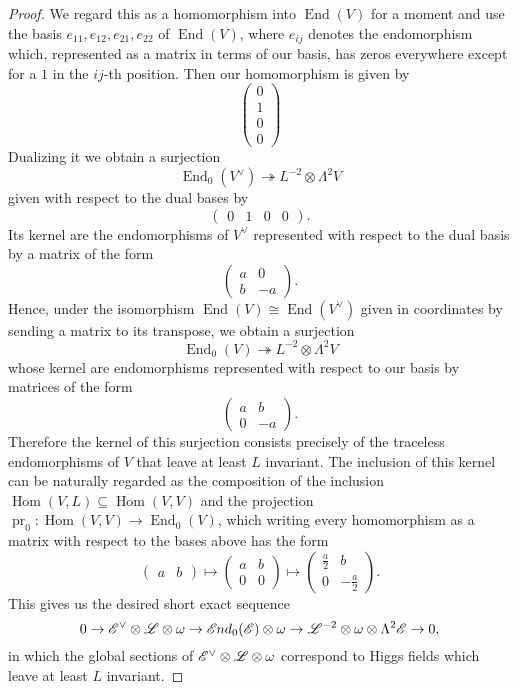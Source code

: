 \documentclass[A4paper, 12pt, british, reqno]{amsart}
\DeclareMathOperator{\Hom}{Hom}
\DeclareMathOperator{\End}{End}
\DeclareMathOperator{\pr}{pr}
\newcommand{\ot}{\otimes}
\newcommand{\dual}{^{\vee}}
\begin{document}
\begin{lm}
\begin{proof}
	We regard this as a homomorphism into $\End(V)$ for a moment and use the basis $e_{11},e_{12},e_{21},e_{22}$ of $\End(V)$, where $e_{ij}$ denotes the endomorphism which, represented as a matrix in terms of our basis, has zeros everywhere except for a $1$ in the $ij$-th position.
	Then our homomorphism is given by
	\[ 
	    \begin{pmatrix}
		0 \\
		1 \\
		0 \\
		0
	    \end{pmatrix}
	\]
	Dualizing it we obtain a surjection
	\[ \End_{0}(V\dual)\twoheadrightarrow L^{-2}\ot \Lambda^{2}V \]
	given with respect to the dual bases by
	\[
	    \begin{pmatrix}
		0 & 1 & 0 & 0
	    \end{pmatrix}.
	\]
	Its kernel are the endomorphisms of $V\dual$ represented with respect to the dual basis by a matrix of the form
	\[
	    \begin{pmatrix}
		a & 0 \\
		b & -a
	    \end{pmatrix}.
	\]
	Hence, under the isomorphism $\End(V)\cong \End(V\dual)$ given in coordinates by sending a matrix to its transpose, we obtain a surjection
	\[ \End_{0}(V)\twoheadrightarrow L^{-2}\ot \Lambda^{2}V \]
	whose kernel are endomorphisms represented with respect to our basis by matrices of the form
	\[
	    \begin{pmatrix}
		a & b \\
		0 & -a
	    \end{pmatrix}.
	\]
	Therefore the kernel of this surjection consists precisely of the traceless endomorphisms of $V$ that leave at least $L$ invariant.
	The inclusion of this kernel can be naturally regarded as the composition of the inclusion $\Hom(V,L)\subseteq \Hom(V,V)$ and the projection $\pr_{0}\colon \Hom(V,V)\to \End_{0}(V)$, which writing every homomorphism as a matrix with respect to the bases above has the form
	\[ 
	\begin{pmatrix}
	    a & b
	\end{pmatrix}
	\mapsto
	\begin{pmatrix}
	    a & b \\
	    0 & 0
	\end{pmatrix}
	\mapsto
	\begin{pmatrix}
	    \frac{a}{2} & b \\
	    0 & -\frac{a}{2}
	\end{pmatrix}.
	\]
	This gives us the desired short exact sequence
	\[ 0\to \E\dual\ot \L\ot \w\to \sEnd_{0}(\E)\ot \w\to \L^{-2}\ot \w\ot \Lambda^{2}\E\to 0, \]
	in which the global sections of $\E\dual \ot \L\ot \w$ correspond to Higgs fields which leave at least $L$ invariant.
    \end{proof}
\end{lm}
\end{document}
